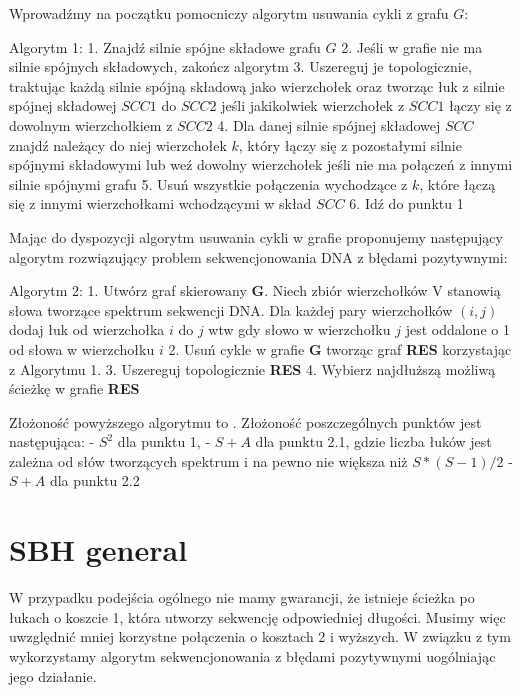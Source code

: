 \documentclass[a4paper,10pt]{article}
\begin{document}
Wprowadźmy na początku pomocniczy algorytm usuwania cykli z grafu $G$:

Algorytm 1:
1. Znajdź silnie spójne składowe grafu $G$
2. Jeśli w grafie nie ma silnie spójnych składowych, zakończ algorytm
3. Uszereguj je topologicznie, traktując każdą silnie spójną składową jako wierzchołek oraz tworząc łuk z silnie spójnej składowej $SCC1$ do $SCC2$ jeśli jakikolwiek wierzchołek z $SCC1$ łączy się z dowolnym wierzchołkiem z $SCC2$
4. Dla danej silnie spójnej składowej $SCC$ znajdź należący do niej wierzchołek $k$, który łączy się z pozostałymi silnie spójnymi składowymi lub weź dowolny wierzchołek jeśli nie ma połączeń z innymi silnie spójnymi grafu
5. Usuń wszystkie połączenia wychodzące z $k$, które łączą się z innymi wierzchołkami wchodzącymi w skład $SCC$
6. Idź do punktu 1

Mając do dyspozycji algorytm usuwania cykli w grafie proponujemy następujący algorytm rozwiązujący problem sekwencjonowania DNA z błędami pozytywnymi:

Algorytm 2:
1. Utwórz graf skierowany {\bf G}. Niech zbiór wierzchołków V stanowią słowa tworzące spektrum sekwencji DNA. Dla każdej pary wierzchołków $(i,j)$ dodaj łuk od wierzchołka $i$ do $j$ wtw gdy słowo w wierzchołku $j$ jest oddalone o 1 od słowa w wierzchołku $i$
2. Usuń cykle w grafie {\bf G} tworząc graf {\bf RES} korzystając z Algorytmu 1.
3. Uszereguj topologicznie {\bf RES}
4. Wybierz najdłuższą możliwą ścieżkę w grafie {\bf RES}

Złożoność powyższego algorytmu to $ $. Złożoność poszczególnych punktów jest następująca:
- $S^2$ dla punktu 1,
- $S + A$ dla punktu 2.1, gdzie liczba łuków jest zależna od słów tworzących spektrum i na pewno nie większa niż $S * (S-1) / 2$
- $S + A$ dla punktu 2.2

\section{SBH general}
W przypadku podejścia ogólnego nie mamy gwarancji, że istnieje ścieżka po łukach o koszcie 1, która utworzy sekwencję odpowiedniej długości. Musimy więc uwzględnić mniej korzystne połączenia o kosztach 2 i wyższych. W związku z tym wykorzystamy algorytm sekwencjonowania z błędami pozytywnymi uogólniając jego działanie.
\end{document}
